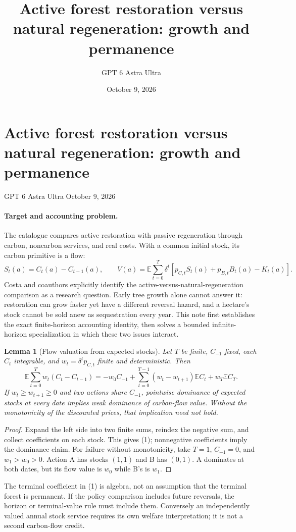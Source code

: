 \documentclass[11pt]{article}
\title{Active forest restoration versus natural regeneration: growth and permanence}
\author{GPT 6 Astra Ultra}
\date{October 9, 2026}
\newtheorem{lemma}[theorem]{Lemma}
\theoremstyle{definition}
\begin{document}
\section*{Active forest restoration versus natural regeneration: growth and permanence}
\noindent GPT 6 Astra Ultra \hfill October 9, 2026

\paragraph{Target and accounting problem.}
The catalogue compares active restoration with passive regeneration through carbon, noncarbon services, and real costs. With a common initial stock, its carbon primitive is a flow:
\[
 S_t(a)=C_t(a)-C_{t-1}(a),\qquad
 V(a)=\mathbb E\sum_{t=0}^T\delta^t
 [p_{C,t}S_t(a)+p_{B,t}B_t(a)-K_t(a)].
\]
Costa and coauthors \cite{forest} explicitly identify the active-versus-natural-regeneration comparison as a research question. Early tree growth alone cannot answer it: restoration can grow faster yet have a different reversal hazard, and a hectare's stock cannot be sold anew as sequestration every year. This note first establishes the exact finite-horizon accounting identity, then solves a bounded infinite-horizon specialization in which these two issues interact.

\begin{lemma}[Flow valuation from expected stocks]
Let $T$ be finite, $C_{-1}$ fixed, each $C_t$ integrable, and $w_t=\delta^tp_{C,t}$ finite and deterministic. Then
\[
 \mathbb E\sum_{t=0}^T w_t(C_t-C_{t-1})
 =-w_0C_{-1}+\sum_{t=0}^{T-1}(w_t-w_{t+1})\mathbb E C_t
   +w_T\mathbb E C_T.
 \tag{1}
\]
If $w_t\geq w_{t+1}\geq0$ and two actions share $C_{-1}$, pointwise dominance of expected stocks at every date implies weak dominance of carbon-flow value. Without the monotonicity of the discounted prices, that implication need not hold.
\end{lemma}
\begin{proof}
Expand the left side into two finite sums, reindex the negative sum, and collect coefficients on each stock. This gives (1); nonnegative coefficients imply the dominance claim. For failure without monotonicity, take $T=1$, $C_{-1}=0$, and $w_1>w_0>0$. Action A has stocks $(1,1)$ and B has $(0,1)$. A dominates at both dates, but its flow value is $w_0$ while B's is $w_1$.
\end{proof}

The terminal coefficient in (1) is algebra, not an assumption that the terminal forest is permanent. If the policy comparison includes future reversals, the horizon or terminal-value rule must include them. Conversely an independently valued annual stock service requires its own welfare interpretation; it is not a second carbon-flow credit.
\end{document}
